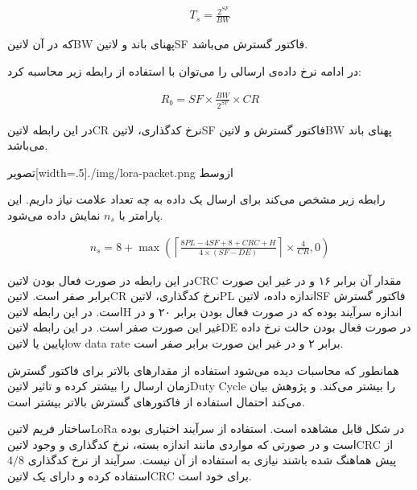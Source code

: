 \begin{align}
  \label{معادله: زمان علامت در LoRa}
  T_{s} = \frac{2^{SF}}{BW}
\end{align}

که در آن ‌لاتین{BW} پهنای باند و ‌لاتین{SF} فاکتور گسترش می‌باشد.

در ادامه نرخ داده‌ی ارسالی را می‌توان با استفاده از رابطه زیر محاسبه کرد:

\begin{align}
  \label{معادله: نرخ داده در LoRa}
  R_{b} = SF \times \frac{BW}{2^{SF}} \times CR
\end{align}

در این رابطه ‌لاتین{CR} نرخ کدگذاری، ‌لاتین{SF} فاکتور گسترش و ‌لاتین{BW} پهنای باند می‌باشد.

‌تصویر[width=.5\textwidth]{./img/lora-packet.png}
‌ازوسط

رابطه زیر مشخص می‌کند برای ارسال یک داده به چه تعداد علامت نیاز داریم. این پارامتر با $n_{s}$ نمایش داده می‌شود.

\begin{align}
  \label{معادله: تعداد علائم مورد نیاز در LoRa}
  n_{s} = 8 + \max\left( \left\lceil \frac{8PL - 4SF + 8 + CRC + H}{4 \times (SF - DE)} \right\rceil \times \frac{4}{CR}, 0 \right)
\end{align}

در این رابطه در صورت فعال بودن ‌لاتین{CRC} مقدار آن برابر ۱۶ و در غیر این صورت برابر صفر است.
‌لاتین{CR} نرخ کدگذاری،
‌لاتین{PL} اندازه داده،
‌لاتین{SF} فاکتور گسترش است.
در این رابطه ‌لاتین{H} اندازه سرآیند بوده که در صورت فعال بودن برابر ۲۰ و در غیر این صورت صفر است.
در این رابطه ‌لاتین{DE} در صورت فعال بودن حالت نرخ داده پایین یا ‌لاتین{low data rate} برابر ۲ و در غیر این صورت برابر صفر است.

همانطور که محاسبات دیده می‌شود استفاده از مقدارهای بالاتر برای فاکتور گسترش زمان ارسال را بیشتر کرده و تاثیر ‌لاتین{Duty Cycle} را بیشتر می‌کند.
و پژوهش  بیان می‌کند احتمال استفاده از فاکتورهای گسترش بالاتر بیشتر است.

ساختار فریم ‌لاتین{LoRa} در شکل  قابل مشاهده است. استفاده از سرآیند اختیاری بوده است و در صورتی که مواردی مانند اندازه بسته،
نرخ کدگذاری و وجود ‌لاتین{CRC} از پیش هماهنگ شده باشند نیازی به استفاده از آن نیست. سرآیند از نرخ کدگذاری $4/8$ استفاده کرده و دارای یک ‌لاتین{CRC}
برای خود است.

